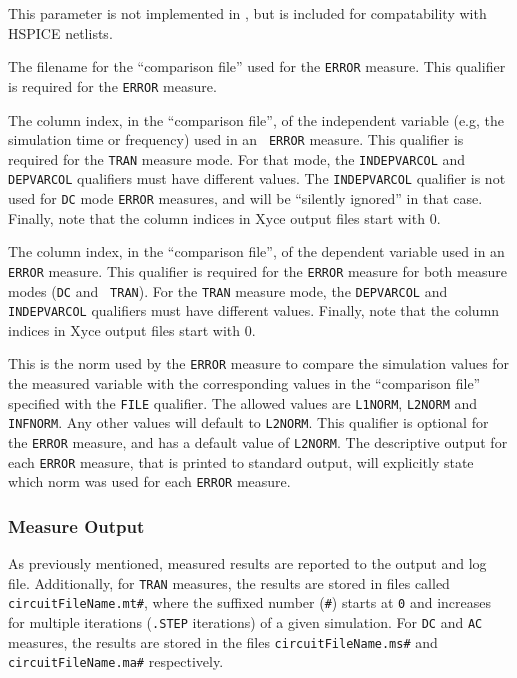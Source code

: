 \begin{Command}
\begin{Arguments}

This parameter is not implemented in \Xyce{}, but is included for compatability
with HSPICE netlists.

The filename for the ``comparison file'' used for the {\tt ERROR}
measure.  This qualifier is required for the {\tt ERROR} measure.

The column index, in the ``comparison file'', of the independent
variable (e.g, the simulation time or frequency) used in an {\tt
ERROR} measure.  This qualifier is required for the {\tt TRAN} measure
mode.  For that mode, the {\tt INDEPVARCOL} and {\tt DEPVARCOL}
qualifiers must have different values.  The {\tt INDEPVARCOL}
qualifier is not used for {\tt DC} mode {\tt ERROR} measures, and will
be ``silently ignored'' in that case.  Finally, note that the column
indices in Xyce output files start with 0.

The column index, in the ``comparison file'', of the dependent
variable used in an {\tt ERROR} measure.  This qualifier is required
for the {\tt ERROR} measure for both measure modes ({\tt DC} and {\tt
TRAN}).  For the {\tt TRAN} measure mode, the {\tt DEPVARCOL} and {\tt
INDEPVARCOL} qualifiers must have different values.  Finally, note
that the column indices in Xyce output files start with 0.

This is the norm used by the {\tt ERROR} measure to compare the
simulation values for the measured variable with the corresponding
values in the ``comparison file'' specified with the {\tt FILE}
qualifier.  The allowed values are {\tt L1NORM}, {\tt L2NORM} and {\tt
INFNORM}.  Any other values will default to {\tt L2NORM}.  This
qualifier is optional for the {\tt ERROR} measure, and has a default
value of {\tt L2NORM}.  The descriptive output for each {\tt ERROR}
measure, that is printed to standard output, will explicitly state
which norm was used for each {\tt ERROR} measure.

\end{Arguments}

\end {Command}

\subsubsection{Measure Output}
\label{Measure_Measurement_Output}
As previously mentioned, measured results are reported to the output
and log file.  Additionally, for \texttt{TRAN} measures, the results
are stored in files called
\texttt{circuitFileName.mt\#}, where the suffixed number (\texttt{\#}) starts
at \texttt{0} and increases for multiple iterations (\texttt{.STEP}
iterations) of a given simulation. For \texttt{DC} and \texttt{AC}
measures, the results are stored in the
files \texttt{circuitFileName.ms\#} and \texttt{circuitFileName.ma\#}
respectively.

